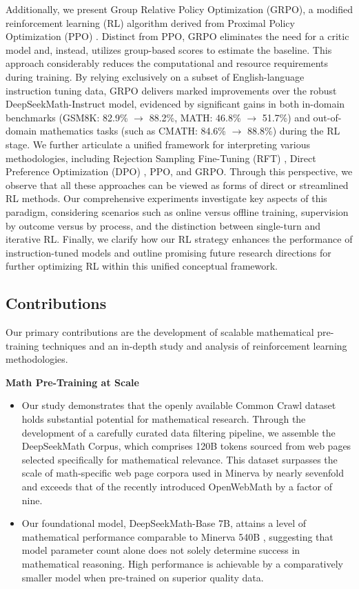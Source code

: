 Additionally, we present Group Relative Policy Optimization (GRPO), a modified reinforcement learning (RL) algorithm derived from Proximal Policy Optimization (PPO) \citep{schulman2017proximal}. Distinct from PPO, GRPO eliminates the need for a critic model and, instead, utilizes group-based scores to estimate the baseline. This approach considerably reduces the computational and resource requirements during training. By relying exclusively on a subset of English-language instruction tuning data, GRPO delivers marked improvements over the robust DeepSeekMath-Instruct model, evidenced by significant gains in both in-domain benchmarks (GSM8K: 82.9\% $\rightarrow$ 88.2\%, MATH: 46.8\% $\rightarrow$ 51.7\%) and out-of-domain mathematics tasks (such as CMATH: 84.6\% $\rightarrow$ 88.8\%) during the RL stage. We further articulate a unified framework for interpreting various methodologies, including Rejection Sampling Fine-Tuning (RFT) \citep{yuan2023scaling}, Direct Preference Optimization (DPO) \citep{dpo}, PPO, and GRPO. Through this perspective, we observe that all these approaches can be viewed as forms of direct or streamlined RL methods. Our comprehensive experiments investigate key aspects of this paradigm, considering scenarios such as online versus offline training, supervision by outcome versus by process, and the distinction between single-turn and iterative RL. Finally, we clarify how our RL strategy enhances the performance of instruction-tuned models and outline promising future research directions for further optimizing RL within this unified conceptual framework.

\subsection{Contributions}
Our primary contributions are the development of scalable mathematical pre-training techniques and an in-depth study and analysis of reinforcement learning methodologies.

\textbf{Math Pre-Training at Scale}

\begin{itemize}[topsep=0pt]
    \item Our study demonstrates that the openly available Common Crawl dataset holds substantial potential for mathematical research. Through the development of a carefully curated data filtering pipeline, we assemble the DeepSeekMath Corpus, which comprises 120B tokens sourced from web pages selected specifically for mathematical relevance. This dataset surpasses the scale of math-specific web page corpora used in Minerva \citep{minerva} by nearly sevenfold and exceeds that of the recently introduced OpenWebMath \citep{openwebmath} by a factor of nine.

    \item Our foundational model, DeepSeekMath-Base 7B, attains a level of mathematical performance comparable to Minerva 540B \citep{minerva}, suggesting that model parameter count alone does not solely determine success in mathematical reasoning. High performance is achievable by a comparatively smaller model when pre-trained on superior quality data.
\end{itemize}

